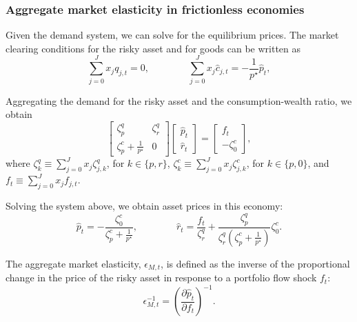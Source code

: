 \subsubsection{Aggregate market elasticity in frictionless economies}

Given the demand system, we can solve for the equilibrium prices. The market clearing conditions for the risky asset and for goods can be written as
\begin{equation}
    \sum_{j=0}^J x_{j} q_{j,t} = 0, \qquad \qquad 
    \sum_{j=0}^J x_{j} \hat{c}_{j,t} = -\frac{1}{p^\star} \hat{p}_t,\nonumber
\end{equation}

Aggregating the demand for the risky asset and the consumption-wealth ratio, we obtain
\begin{equation}
    \left[
    \begin{matrix}
        \zeta^q_p & \zeta^q_r\\
        \zeta^c_p + \frac{1}{p^\star} & 0
    \end{matrix}
    \right]\left[ \begin{matrix}
        \hat{p}_t\\
        \hat{r}_t
    \end{matrix} \right] =
    \left[ \begin{matrix}
        f_t\\
        -\zeta_{0}^c
    \end{matrix} \right],\nonumber
\end{equation}
where $\zeta^q_{k} \equiv \sum_{j=0}^J x_j \zeta_{j,k}^q$, for $k \in \{p,r\}$, $\zeta^c_{k} \equiv \sum_{j=0}^J x_j \zeta^c_{j,k}$, for $k \in \{p,0\}$, and $f_t \equiv \sum_{j=0}^J x_j f_{j,t}$.

Solving the system above, we obtain asset prices in this economy: 
\begin{equation}
    \hat{p}_t = - \frac{\zeta_0^c}{\zeta_p^c + \frac{1}{p^\star} }, \qquad \qquad 
    \hat{r}_t = \frac{f_t}{\zeta_r^q} + \frac{\zeta_p^q}{\zeta_r^q \left( \zeta_p^c + \frac{1}{p^\star} \right)} \zeta_0^c.\nonumber
\end{equation}

The aggregate market elasticity, $\epsilon_{M,t}$, is defined as the inverse of the proportional change in the price of the risky asset in response to a portfolio flow shock $f_t$:
\begin{equation}
    \epsilon_{M,t}^{-1} = \left( \frac{\partial \hat{p}_t}{\partial f_t} \right)^{-1}.\nonumber
\end{equation}

